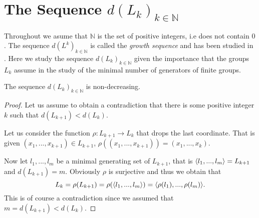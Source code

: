 \section{The Sequence \texorpdfstring{$d(L_k)_{k \in \mathbb{N}}$}{dLkN}}

Throughout we asume that $\mathbb{N}$ is the set of positive integers, i.e does not contain $0$.
The sequence $d(L^k)_{k \in \mathbb{N}}$ is called the \textit{growth sequence} and has been studied in \cite{WiegoldGSFG, WiegoldGSFGII, WiegoldGSFGIII, WiegoldGSFGIV}. Here we study the sequence $d(L_k)_{k \in \mathbb{N}}$ given the importance that the groups $L_k$ assume in the study of the minimal number of generators of finite groups. 

\begin{theorem}
    \label{S2:nondecLk}
    The sequence $d(L_k)_{k \in \mathbb{N}}$ is non-decreasing.
\end{theorem}

\begin{proof}
    Let us assume to obtain a contradiction that there is some positive integer $k$ such that $d(L_{k+1}) < d(L_k)$. 
    
    Let us consider the function $\rho: L_{k+1} \rightarrow L_k$ that drops the last coordinate. That is given $(x_1,...,x_{k+1}) \in L_{k+1}$, $\rho((x_1,...,x_{k+1})) = (x_1,...,x_k)$.

    Now let $l_1,...,l_m$ be a minimal generating set of $L_{k+1}$, that is $
    \langle l_1,...,l_m \rangle = L_{k+1}$ and $d(L_{k+1}) = m$.
    Obviously $\rho$ is surjective and thus we obtain that 
    $$
    L_k = \rho(L_{k+1}) = \rho(\langle l_1,...,l_m \rangle) = \langle \rho(l_1),...,\rho(l_m) \rangle.
    $$
    This is of course a contradiction since we assumed that $m = d(L_{k+1}) < d(L_k)$.
\end{proof}

